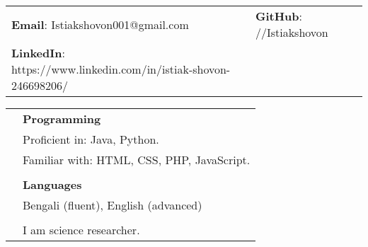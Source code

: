 \documentclass[letterpaper, 11pt]{article}
\begin{document}


\vspace{0.5cm} 
\begin{center}
\begin{tabular}{lll}
\textbf{Email}: Istiakshovon001@gmail.com      &
\hspace{0.55in} \textbf{GitHub}: //Istiakshovon    &\\

\textbf{LinkedIn}: https://www.linkedin.com/in/istiak-shovon-246698206/   & 
\end{tabular}
\end{center}


\setlength{\tabcolsep}{8pt}

\begin{longtable}{p{1.3in}p{4.8in}}


{\color{OliveGreen}{Skills}} 
& \textbf{Programming}\\
& Proficient in: Java, Python. \\
& Familiar with: HTML, CSS, PHP, JavaScript. \\
& \\

& \textbf{Languages} \\
& Bengali (fluent), English (advanced) \\
& \\



\nohyphens{\color{OliveGreen}{Other interests}} & I am science researcher.\\


\end{longtable}
\end{document}
